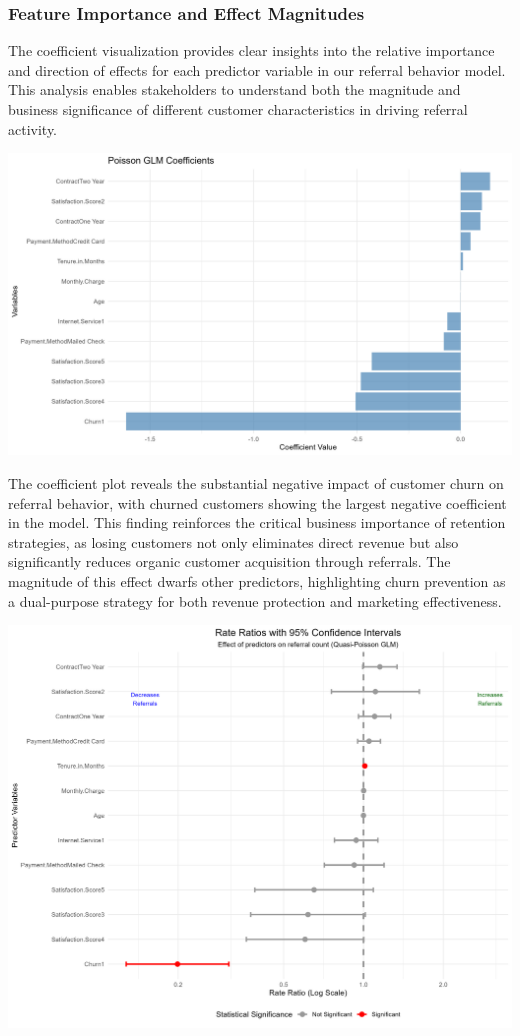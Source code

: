 \documentclass[
]{article}
\begin{document}
\hypertarget{feature-importance-and-effect-magnitudes}{%
\subsubsection{Feature Importance and Effect
Magnitudes}\label{feature-importance-and-effect-magnitudes}}

The coefficient visualization provides clear insights into the relative
importance and direction of effects for each predictor variable in our
referral behavior model. This analysis enables stakeholders to
understand both the magnitude and business significance of different
customer characteristics in driving referral activity.

\begin{center}\includegraphics[width=0.8\linewidth]{Plots/poisson_coefficients} \end{center}

The coefficient plot reveals the substantial negative impact of customer
churn on referral behavior, with churned customers showing the largest
negative coefficient in the model. This finding reinforces the critical
business importance of retention strategies, as losing customers not
only eliminates direct revenue but also significantly reduces organic
customer acquisition through referrals. The magnitude of this effect
dwarfs other predictors, highlighting churn prevention as a dual-purpose
strategy for both revenue protection and marketing effectiveness.

\begin{center}\includegraphics[width=0.8\linewidth]{Plots/poisson_forest_plot} \end{center}
\end{document}
